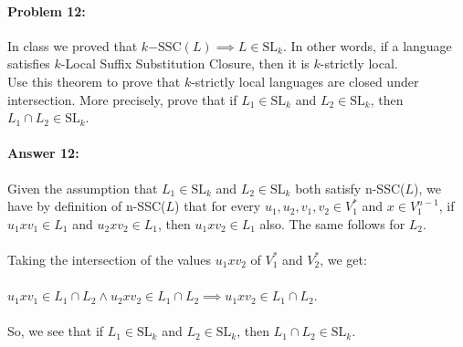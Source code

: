 \documentclass[10pt]{article}
\begin{document}
\hrulefill
\paragraph{Problem 12:}

In class we proved that
$k\mathrm{-SSC}(L) \implies L \in \mathrm{SL}_k$. In other words, if a
language satisfies $k$-Local Suffix Substitution Closure, then it is
$k$-strictly local.\\

\noindent Use this theorem to prove that $k$-strictly local languages
are closed under intersection. More precisely, prove that if
$L_1 \in \mathrm{SL}_k$ and $L_2 \in \mathrm{SL}_k$, then
$L_1 \cap L_2 \in \mathrm{SL}_k$.

\paragraph{Answer 12:} Given the assumption that $L_1 \in \mathrm{SL}_k$ and $L_2 \in \mathrm{SL}_k$ both satisfy n-SSC($L$), we have by definition of n-SSC($L$) that for every $u_1, u_2, v_1, v_2 \in V^*_1$ and $x \in V^{n-1}_1$, if $u_1 x v_1 \in L_1$ and $u_2 x v_2 \in L_1$, then $u_1 x v_2 \in L_1$ also. The same follows for $L_2$. 
\\
\\
Taking the intersection of the values $u_1 x v_2$ of $V^*_1$ and $V^*_2$, we get: 
\\
\\
$u_1 x v_1 \in L_1 \cap L_2 \wedge u_2 x v_2 \in L_1 \cap L_2 \implies u_1
x v_2 \in L_1 \cap L_2$.
\\
\\
So, we see that if $L_1 \in \mathrm{SL}_k$ and $L_2 \in \mathrm{SL}_k$, then
$L_1 \cap L_2 \in \mathrm{SL}_k$.
\end{document}
